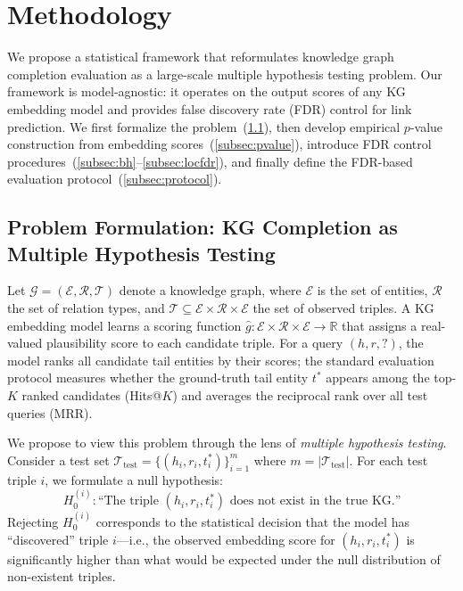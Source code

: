 \section{Methodology}
\label{sec:method}

We propose a statistical framework that reformulates knowledge graph completion evaluation as a large-scale multiple hypothesis testing problem. Our framework is model-agnostic: it operates on the output scores of any KG embedding model and provides false discovery rate (FDR) control for link prediction. We first formalize the problem~(\ref{subsec:formulation}), then develop empirical $p$-value construction from embedding scores~(\ref{subsec:pvalue}), introduce FDR control procedures~(\ref{subsec:bh}--\ref{subsec:locfdr}), and finally define the FDR-based evaluation protocol~(\ref{subsec:protocol}).

\subsection{Problem Formulation: KG Completion as Multiple Hypothesis Testing}
\label{subsec:formulation}

Let $\mathcal{G} = (\mathcal{E}, \mathcal{R}, \mathcal{T})$ denote a knowledge graph, where $\mathcal{E}$ is the set of entities, $\mathcal{R}$ the set of relation types, and $\mathcal{T} \subseteq \mathcal{E} \times \mathcal{R} \times \mathcal{E}$ the set of observed triples.
A KG embedding model learns a scoring function $\hat{g}: \mathcal{E} \times \mathcal{R} \times \mathcal{E} \to \mathbb{R}$ that assigns a real-valued plausibility score to each candidate triple.
For a query $(h, r, ?)$, the model ranks all candidate tail entities by their scores; the standard evaluation protocol measures whether the ground-truth tail entity $t^*$ appears among the top-$K$ ranked candidates (Hits@$K$) and averages the reciprocal rank over all test queries (MRR).

We propose to view this problem through the lens of \emph{multiple hypothesis testing}.
Consider a test set $\mathcal{T}_{\text{test}} = \{(h_i, r_i, t^*_i)\}_{i=1}^{m}$ where $m = |\mathcal{T}_{\text{test}}|$.
For each test triple $i$, we formulate a null hypothesis:
\begin{equation}
    H_0^{(i)}: \text{``The triple } (h_i, r_i, t^*_i) \text{ does not exist in the true KG.''}
    \label{eq:null}
\end{equation}
Rejecting $H_0^{(i)}$ corresponds to the statistical decision that the model has ``discovered'' triple $i$---i.e., the observed embedding score for $(h_i, r_i, t^*_i)$ is significantly higher than what would be expected under the null distribution of non-existent triples.

